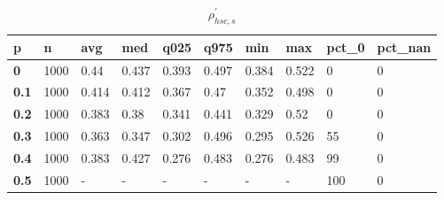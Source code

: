 \begin{table}[h]
 \centering 
\footnotesize
\caption{$\rho_{hsc,s}^\prime $}
\label{tab:alphahscs}
\begin{tabular}[h]{|l|l|l|l|l|l|l|l|l|l|
    } \hline
\textbf{ p} & \textbf{ n} & \textbf{ avg} & \textbf{ med} & \textbf{ q025} & \textbf{ q975} & \textbf{ min} & \textbf{ max} & \textbf{ pct\_0} & \textbf{ pct\_nan}
    \\ \hline
  \textbf{  0} & 1000 &  0.44 & 0.437 & 0.393 & 0.497 & 0.384 & 0.522 &   0 & 0
    \\ \hline
  \textbf{0.1} & 1000 & 0.414 & 0.412 & 0.367 &  0.47 & 0.352 & 0.498 &   0 & 0
    \\ \hline
  \textbf{0.2} & 1000 & 0.383 &  0.38 & 0.341 & 0.441 & 0.329 &  0.52 &   0 & 0
    \\ \hline
  \textbf{0.3} & 1000 & 0.363 & 0.347 & 0.302 & 0.496 & 0.295 & 0.526 &  55 & 0
    \\ \hline
  \textbf{0.4} & 1000 & 0.383 & 0.427 & 0.276 & 0.483 & 0.276 & 0.483 &  99 & 0
    \\ \hline
  \textbf{0.5} & 1000 & - & - & - & - & - & - & 100 & 0
    \\ \hline
 \end{tabular}
 \end{table}
